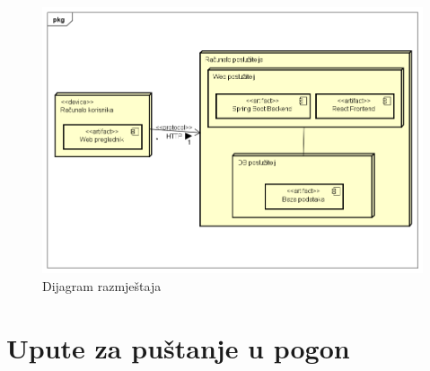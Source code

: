 		
		\begin{figure}[H]
			\includegraphics[width=\linewidth]{dijagrami/Deployment Diagram.png}
			\centering
			\caption{Dijagram razmještaja}
			\label{fig:dijagram_razmještaja}
		\end{figure}
	\newpage
		
		
		\section{Upute za puštanje u pogon}
		
%		
%			
%			
			
